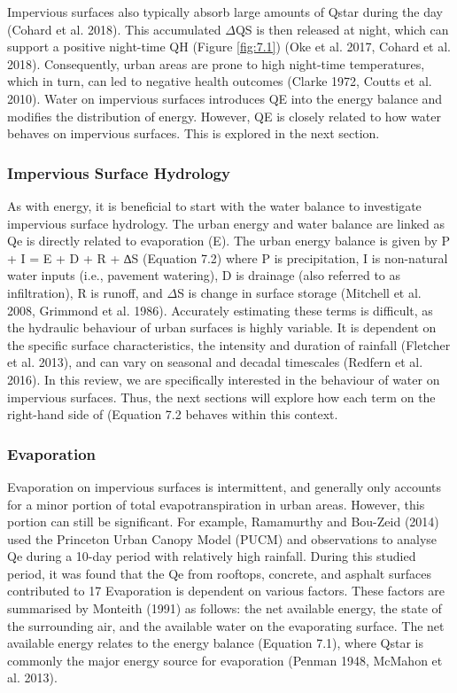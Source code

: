 \documentclass[final,3p,times,authoryear]{elsarticle}
\begin{document}
Impervious surfaces also typically absorb large amounts of \gls{Qstar} during the day (Cohard et al. 2018). This accumulated $\Delta$QS is then released at night, which can support a positive night-time QH (Figure \ref{fig:7.1}) (Oke et al. 2017, Cohard et al. 2018).
Consequently, urban areas are prone to high night-time temperatures, which in turn, can
led to negative health outcomes (Clarke 1972, Coutts et al. 2010).
Water on impervious surfaces introduces QE into the energy balance and modifies the
distribution of energy. However, QE is closely related to how water behaves on
impervious surfaces. This is explored in the next section.

\subsubsection{Impervious Surface Hydrology}\label{sec:appendix7.1.3}
As with energy, it is beneficial to start with the water balance to investigate impervious
surface hydrology. The urban energy and water balance are linked as \gls{Qe} is directly
related to evaporation (E). The urban energy balance is given by
P + I = E + D + R + ∆S
(Equation 7.2)
where P is precipitation, I is non-natural water inputs (i.e., pavement watering), D is
drainage (also referred to as infiltration), R is runoff, and $\Delta$S is change in surface storage
(Mitchell et al. 2008, Grimmond et al. 1986).
Accurately estimating these terms is difficult, as the hydraulic behaviour of urban
surfaces is highly variable. It is dependent on the specific surface characteristics, the intensity and duration of rainfall (Fletcher et al. 2013), and can vary on seasonal and
decadal timescales (Redfern et al. 2016).
In this review, we are specifically interested in the behaviour of water on impervious
surfaces. Thus, the next sections will explore how each term on the right-hand side of
(Equation 7.2 behaves within this context.

\subsubsection{Evaporation}\label{sec:appendix7.1.3.1}


Evaporation on impervious surfaces is intermittent, and generally only accounts for a
minor portion of total evapotranspiration in urban areas. However, this portion can still
be significant. For example, Ramamurthy and Bou-Zeid (2014) used the Princeton
Urban Canopy Model (PUCM) and observations to analyse \gls{Qe} during a 10-day period
with relatively high rainfall. During this studied period, it was found that the \gls{Qe} from
rooftops, concrete, and asphalt surfaces contributed to 17%
Evaporation is dependent on various factors. These factors are summarised by Monteith
(1991) as follows: the net available energy, the state of the surrounding air, and the
available water on the evaporating surface.
The net available energy relates to the energy balance (Equation 7.1), where \gls{Qstar} is
commonly the major energy source for evaporation (Penman 1948, McMahon et al.
2013).
\end{document}
